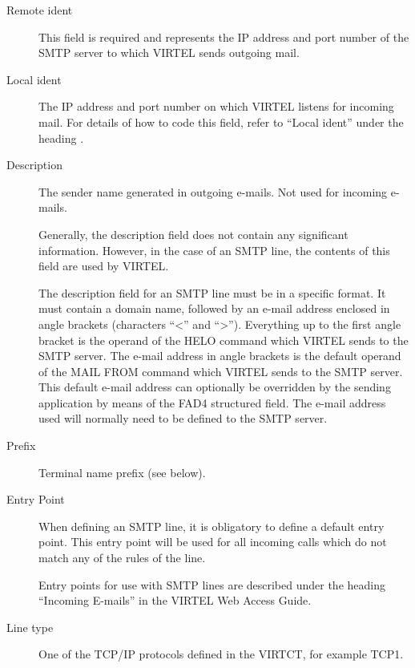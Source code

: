 \documentclass[letterpaper,10pt,english]{sphinxmanual}
\begin{document}
\begin{description}
\item[{Remote ident}] \leavevmode
This field is required and represents the IP address and port number of the SMTP server to which VIRTEL sends outgoing mail.

\item[{Local ident}] \leavevmode
The IP address and port number on which VIRTEL listens for incoming mail. For details of how to code this field, refer to “Local ident” under the heading {\hyperref[\detokenize{connectivity_guide:bookmark13}]{}}.

\item[{Description}] \leavevmode
The sender name generated in outgoing e-mails. Not used for incoming e-mails.

Generally, the description field does not contain any significant information. However, in the case of an SMTP line, the contents of this field are used by VIRTEL.

The description field for an SMTP line must be in a specific format. It must contain a domain name, followed by an e-mail address enclosed in angle brackets (characters “\textless{}” and “\textgreater{}”). Everything up to the first angle bracket is the operand of the HELO command which VIRTEL sends to the SMTP server. The e-mail address in angle brackets is the default operand of the MAIL FROM command which VIRTEL sends to the SMTP server. This default e-mail address can optionally be overridden by the sending application by means of the
FAD4 structured field. The e-mail address used will normally need to be defined to the SMTP server.

\item[{Prefix}] \leavevmode
Terminal name prefix (see below).

\item[{Entry Point}] \leavevmode
When defining an SMTP line, it is obligatory to define a default entry point. This entry point will be used for all incoming calls which do not match any of the rules of the line.

Entry points for use with SMTP lines are described under the heading “Incoming E-mails” in the VIRTEL Web Access Guide.

\item[{Line type}] \leavevmode
One of the TCP/IP protocols defined in the VIRTCT, for example TCP1.


\end{description}
\end{document}
